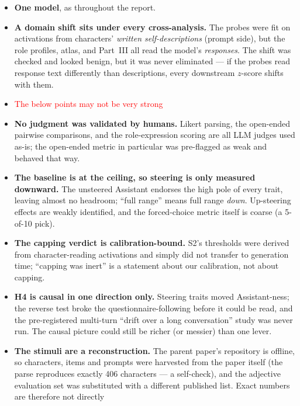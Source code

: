 \documentclass[11pt]{article}
\begin{document}
\begin{itemize}
  \item \textbf{One model}, as throughout the report.
  \item \textbf{A domain shift sits under every cross-analysis.} The probes
        were fit on activations from characters' \emph{written
        self-descriptions} (prompt side), but the role profiles, atlas, and
        Part~III all read the model's \emph{responses}. The shift was checked
        and looked benign, but it was never eliminated --- if the probes read
        response text differently than descriptions, every downstream $z$-score
        shifts with them.
  \item \textcolor{red}{The below points may not be very strong}
  \item \textbf{No judgment was validated by humans.} Likert parsing,
        the open-ended pairwise comparisons, and the role-expression scoring are
        all LLM judges used as-is; the open-ended metric in particular was
        pre-flagged as weak and behaved that way.
  \item \textbf{The baseline is at the ceiling, so steering is only measured
        downward.} The unsteered Assistant endorses the high pole of every
        trait, leaving almost no headroom; ``full range'' means full range
        \emph{down}. Up-steering effects are weakly identified, and the
        forced-choice metric itself is coarse (a 5-of-10 pick).
  \item \textbf{The capping verdict is calibration-bound.} S2's thresholds were
        derived from character-reading activations and simply did not transfer
        to generation time; ``capping was inert'' is a statement about our
        calibration, not about capping.
  \item \textbf{H4 is causal in one direction only.} Steering traits moved
        Assistant-ness; the reverse test broke the questionnaire-following
        before it could be read, and the pre-registered multi-turn
        ``drift over a long conversation'' study was never run. The causal
        picture could still be richer (or messier) than one lever.
  \item \textbf{The stimuli are a reconstruction.} The parent paper's
        repository is offline, so characters, items and prompts were harvested
        from the paper itself (the parse reproduces exactly 406 characters ---
        a self-check), and the adjective evaluation set was substituted with a
        different published list. Exact numbers are therefore not directly

\end{itemize}
\end{document}
